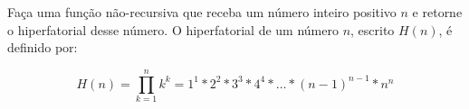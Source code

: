 
\question[10]

Faça uma função não-recursiva que receba um número inteiro positivo $n$ e retorne o hiperfatorial desse número. O hiperfatorial de um número $n$, escrito $H(n)$, é definido por:

\begin{equation*}
 H(n) = \prod_{k=1}^{n}	k^k = 1^1*2^2*3^3*4^4*\ldots*(n-1)^{n-1}*n^n
\end{equation*}

